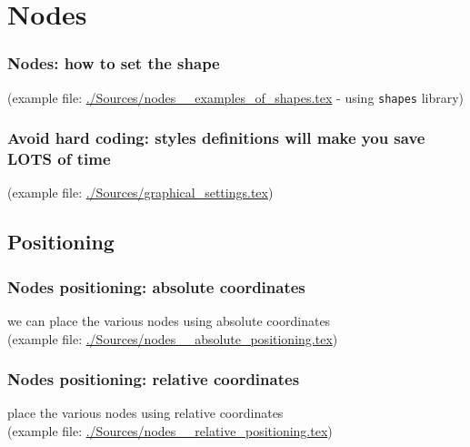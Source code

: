 \section{Nodes}
\label{sec:nodes}




\begin{frame}
	\frametitle{Nodes: how to set the shape}
	(example file: \url{./Sources/nodes__examples_of_shapes.tex} - using \texttt{shapes} library)
	
\end{frame}





\begin{frame}
	\frametitle{Avoid hard coding: styles definitions will make you save LOTS of time}
	\begin{center}
	\end{center}
	(example file: \url{./Sources/graphical_settings.tex})
\end{frame}




\subsection{Positioning}
\label{ssec:positioning}


\begin{frame}
	\frametitle{Nodes positioning: absolute coordinates}
	we can place the various nodes using absolute coordinates \\
	(example file: \url{./Sources/nodes__absolute_positioning.tex})
	
\end{frame}




\begin{frame}
	\frametitle{Nodes positioning: relative coordinates}
	place the various nodes using relative coordinates \\
	(example file: \url{./Sources/nodes__relative_positioning.tex})
	
\end{frame}





